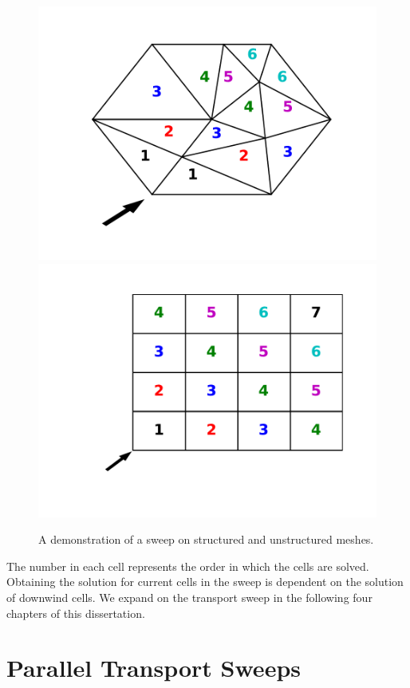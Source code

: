 \begin{figure}[H]
\centering
\includegraphics[scale=0.5]{../figures/UnstructuredMesh.pdf}
\includegraphics[scale = 0.5]{../figures/StructuredMesh.pdf}
\caption{A demonstration of a sweep on structured and unstructured meshes. }
\label{sweeps}
\end{figure}

The number in each cell represents the order in which the cells are solved.
Obtaining the solution for current cells in the sweep is dependent on the solution of downwind cells. We expand on the transport sweep in the following four chapters of this dissertation.

\section*{Parallel Transport Sweeps}

